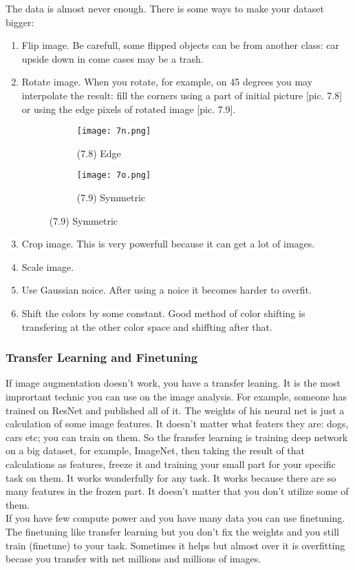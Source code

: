 The data is almost never enough. There is some ways to make your dataset bigger:\\
\begin{enumerate}[label=$\bullet$]
  \item Flip image. Be carefull, some flipped objects can be from another class: car upside down in come cases may be a trash.
  \item Rotate image. When you rotate, for example, on 45 degrees you may interpolate the result: fill the corners using a part of initial picture [pic. 7.8] or using the edge pixels of rotated image [pic. 7.9].\\
  \begin{figure}[h]
  \centering
  \begin{subfigure}[l]{0.2\linewidth}
    \texttt{[image: 7n.png]}
    \caption*{(7.8) Edge}
  \end{subfigure}
  \hspace{2cm}
  \begin{subfigure}[r]{0.2\linewidth}
    \texttt{[image: 7o.png]}
    \caption*{(7.9) Symmetric}
  \end{subfigure}
\end{figure}
  \item Crop image. This is very powerfull because it can get a lot of images.
  \item Scale image.
  \item Use Gaussian noice. After using a noice it becomes harder to overfit.
  \item Shift the colors by some constant. Good method of color shifting is transfering at the other color space and shiffting after that.
\end{enumerate}

\subsubsection*{Transfer Learning and Finetuning}

If image augmentation doesn't work, you have a transfer leaning. It is the most imprortant technic you can use on the image analysis. For example, someone has trained on ResNet and published all of it. The weights of his neural net is just a calculation of some image features. It doesn't matter what featers they are: dogs, cars etc; you can train on them. So the fransfer learning is training deep network on a big dataset, for example, ImageNet, then taking the result of that calculations as features, freeze it and training your small part for your specific task on them. It works wonderfully for any task. It works because there are so many features in the frozen part. It doesn't matter that you don't utilize some of them.\\
If you have few compute power and you have many data you can use finetuning. The finetuning like transfer learning but you don't fix the weights and you still train (finetune) to your task. Sometimes it helps but almost over it is overfitting becase you transfer with net millions and millions of images.